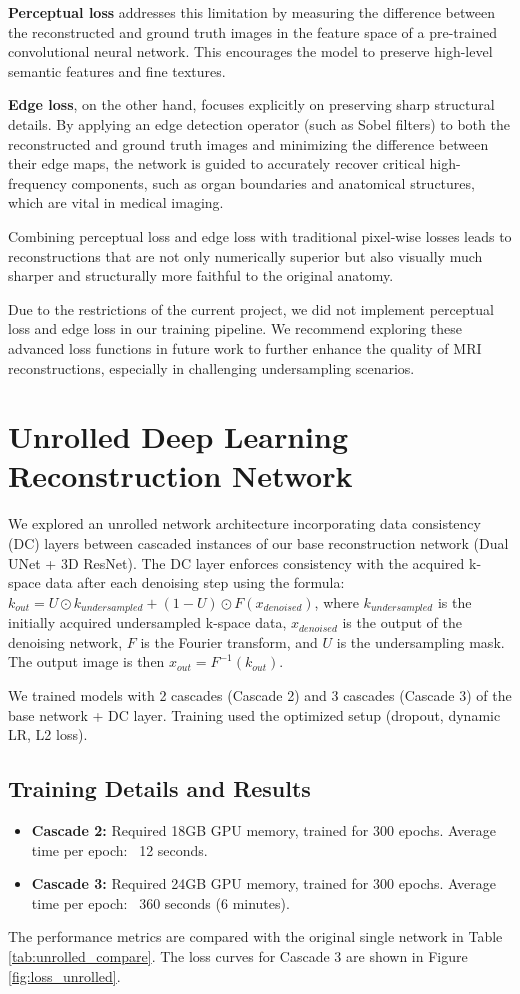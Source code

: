 \documentclass{article}
\begin{document}
\textbf{Perceptual loss} addresses this limitation by measuring the difference between the reconstructed and ground truth images in the feature space of a pre-trained convolutional neural network. This encourages the model to preserve high-level semantic features and fine textures.

\textbf{Edge loss}, on the other hand, focuses explicitly on preserving sharp structural details. By applying an edge detection operator (such as Sobel filters) to both the reconstructed and ground truth images and minimizing the difference between their edge maps, the network is guided to accurately recover critical high-frequency components, such as organ boundaries and anatomical structures, which are vital in medical imaging.

Combining perceptual loss and edge loss with traditional pixel-wise losses leads to reconstructions that are not only numerically superior but also visually much sharper and structurally more faithful to the original anatomy.

Due to the restrictions of the current project, we did not implement perceptual loss and edge loss in our training pipeline. We recommend exploring these advanced loss functions in future work to further enhance the quality of MRI reconstructions, especially in challenging undersampling scenarios.



\section{Unrolled Deep Learning Reconstruction Network}
We explored an unrolled network architecture incorporating data consistency (DC) layers between cascaded instances of our base reconstruction network (Dual UNet + 3D ResNet). The DC layer enforces consistency with the acquired k-space data after each denoising step using the formula:
$k_{out} = U \odot k_{undersampled} + (1 - U) \odot F(x_{denoised})$, where $k_{undersampled}$ is the initially acquired undersampled k-space data, $x_{denoised}$ is the output of the denoising network, $F$ is the Fourier transform, and $U$ is the undersampling mask. The output image is then $x_{out} = F^{-1}(k_{out})$.

We trained models with 2 cascades (Cascade 2) and 3 cascades (Cascade 3) of the base network + DC layer. Training used the optimized setup (dropout, dynamic LR, L2 loss).

\subsection{Training Details and Results}
\begin{itemize}
  \item \textbf{Cascade 2:} Required 18GB GPU memory, trained for 300 epochs. Average time per epoch: ~12 seconds.
  \item \textbf{Cascade 3:} Required 24GB GPU memory, trained for 300 epochs. Average time per epoch: ~360 seconds (6 minutes).
\end{itemize}
The performance metrics are compared with the original single network in Table \ref{tab:unrolled_compare}. The loss curves for Cascade 3 are shown in Figure \ref{fig:loss_unrolled}.
\end{document}

